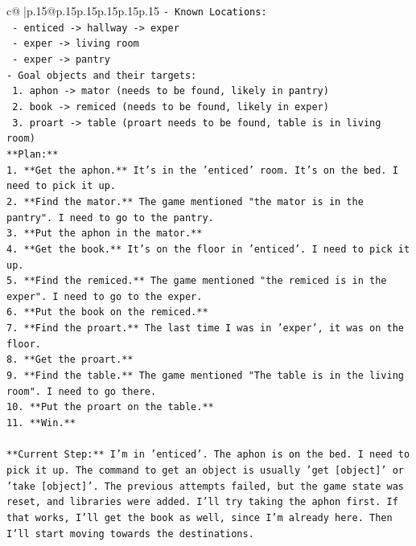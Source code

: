 \documentclass{article}
\begin{document}
{\begin{supertabular}{c@{$\;$}|p{.15\linewidth}@{}p{.15\linewidth}p{.15\linewidth}p{.15\linewidth}p{.15\linewidth}p{.15\linewidth}}
{{{\texttt{{-} Known Locations:} \\
\texttt{    {-} enticed {-}> hallway {-}> exper} \\
\texttt{    {-} exper {-}> living room} \\
\texttt{    {-} exper {-}> pantry} \\
\texttt{{-} Goal objects and their targets:} \\
\texttt{    1. aphon {-}> mator (needs to be found, likely in pantry)} \\
\texttt{    2. book {-}> remiced (needs to be found, likely in exper)} \\
\texttt{    3. proart {-}> table (proart needs to be found, table is in living room)} \\
\texttt{**Plan:**} \\
\texttt{1.  **Get the aphon.** It's in the 'enticed' room. It's on the bed. I need to pick it up.} \\
\texttt{2.  **Find the mator.** The game mentioned "the mator is in the pantry". I need to go to the pantry.} \\
\texttt{3.  **Put the aphon in the mator.**} \\
\texttt{4.  **Get the book.** It's on the floor in 'enticed'. I need to pick it up.} \\
\texttt{5.  **Find the remiced.** The game mentioned "the remiced is in the exper". I need to go to the exper.} \\
\texttt{6.  **Put the book on the remiced.**} \\
\texttt{7.  **Find the proart.** The last time I was in 'exper', it was on the floor.} \\
\texttt{8.  **Get the proart.**} \\
\texttt{9.  **Find the table.** The game mentioned "The table is in the living room". I need to go there.} \\
\texttt{10. **Put the proart on the table.**} \\
\texttt{11. **Win.**} \\
\\ 
\texttt{**Current Step:** I'm in 'enticed'. The aphon is on the bed. I need to pick it up. The command to get an object is usually 'get {[}object{]}' or 'take {[}object{]}'. The previous attempts failed, but the game state was reset, and libraries were added. I'll try taking the aphon first. If that works, I'll get the book as well, since I'm already here. Then I'll start moving towards the destinations.} \\
\\ 
}}}
\end{supertabular}}
\end{document}
